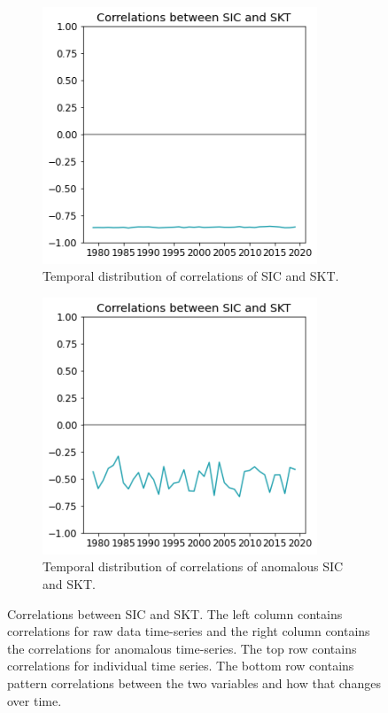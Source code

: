 \documentclass[../main.tex]{subfiles}
\begin{document}
\begin{figure}[H]
\begin{subfigure}[h!]{0.49\textwidth}
\end{subfigure}
\begin{subfigure}[h!]{0.49\textwidth}
\centering
\includegraphics[width=0.9\textwidth]{images/week8/lres/corr_sic_skt_longterm_temporal}
\caption{Temporal distribution of correlations of SIC and SKT.}
\end{subfigure}
\begin{subfigure}[h!]{0.49\textwidth}
\centering
\includegraphics[width=0.9\textwidth]{images/week8/lres/corr_sic_skt_longterm_temporal_anmomalous}
\caption{Temporal distribution of correlations of anomalous SIC and SKT.}
\end{subfigure}
\caption{Correlations between SIC and SKT. The left column contains correlations for raw data time-series and the right column contains the correlations for anomalous time-series. The top row contains correlations for individual time series. The bottom row contains pattern correlations between the two variables and how that changes over time.}
\label{fig:correlation_between_SIC_and_SKT.}
\end{figure}
\end{document}
